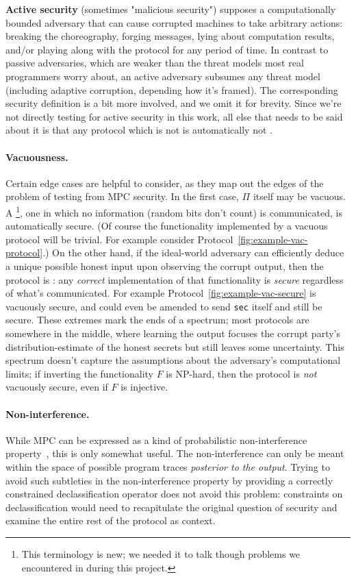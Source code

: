 \documentclass[acmlarge, manuscript, screen, review, anonymous, table]{acmart}
\newcommand{\inlinecode}[2][cho]{\lstinline[language=#1]{#2}}
\begin{document}
\textbf{Active security}
(sometimes "malicious security")
supposes a computationally bounded adversary that can cause corrupted machines to take arbitrary actions:
breaking the choreography,
forging messages,
lying about computation results,
and/or playing along with the protocol for any period of time.
In contrast to passive adversaries, which are weaker than the threat models most real programmers worry about,
an active adversary subsumes any threat model (including adaptive corruption, depending how it's framed).
The corresponding security definition is a bit more involved, and we omit it for brevity.
Since we're not directly testing for active security in this work,
all else that needs to be said about it is that
any protocol which is not  is automatically not .

\paragraph{Vacuousness.}
Certain edge cases are helpful to consider, as they map out the edges of the problem of testing from MPC security.
In the first case, $Π$ itself may be vacuous.
A \footnote{
    This terminology is new; we needed it to talk though problems we encountered in during this project.
}, one in which no information (random bits don't count) is communicated, is automatically secure.
(Of course the functionality implemented by a vacuous protocol will be trivial.
For example consider Protocol~\ref{fig:example-vac-protocol}.)
On the other hand, if the ideal-world adversary can efficiently deduce a unique possible honest input upon observing the corrupt output,
then the protocol is :
any \emph{correct} implementation of that functionality is \emph{secure} regardless of what's communicated.
For example Protocol~\ref{fig:example-vac-secure} is vacuously secure,
and could even be amended to send \inlinecode{sec} itself and still be secure.
These extremes mark the ends of a spectrum; most protocols are somewhere in the middle,
where learning the output focuses the corrupt party's distribution-estimate of the honest secrets but still leaves some uncertainty.
This spectrum doesn't capture the assumptions about the adversary's computational limits;
if inverting the functionality $F$ is NP-hard, then the protocol is \emph{not} vacuously secure, even if $F$ is injective.

\paragraph{Non-interference.}
While MPC can be expressed as a kind of probabilistic non-interference property~\cite{haagh2018computer, almeida2018enforcing}, this is only somewhat useful.
The non-interference can only be meant within the space of possible program traces \emph{posterior to the output}.
Trying to avoid such subtleties in the non-interference property by providing a correctly constrained declassification operator
does not avoid this problem: constraints on declassification would need to recapitulate the original question of security
and examine the entire rest of the protocol as context.
\end{document}

